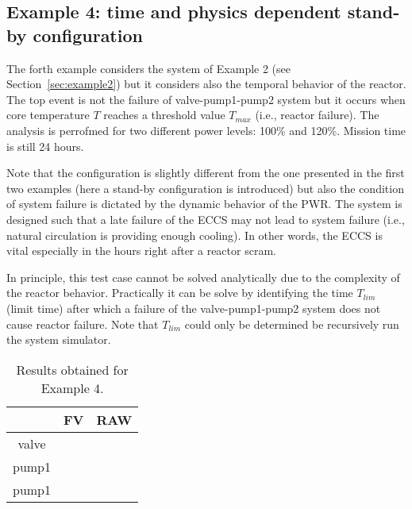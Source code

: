 \subsection{Example 4: time and physics dependent stand-by configuration}
\label{sec:example4}

The forth example considers the system of Example 2 (see Section~\ref{sec:example2}) but it considers 
also the temporal behavior of the reactor.
The top event is not the failure of valve-pump1-pump2 system but it occurs when core temperature $T$
reaches a threshold value $T_{max}$ (i.e., reactor failure). 
The analysis is perrofmed for two different power levels: 100\% and 120\%.
Mission time is still 24 hours.

Note that the configuration is slightly different from the one presented in the first two 
examples (here a stand-by configuration is introduced) but also the condition of system failure 
is dictated by the dynamic behavior of the PWR.  The system is designed such that a late failure 
of the ECCS may not lead to system failure (i.e., natural circulation is providing enough cooling). 
In other words, the ECCS is vital especially in the hours right after a reactor scram.

In principle, this test case cannot be solved analytically due to the complexity of the reactor behavior.
Practically it can be solve by identifying the time $T_{lim}$ (limit time) after which a failure of the  
valve-pump1-pump2 system does not cause reactor failure.
Note that $T_{lim}$ could only be determined be recursively run the system simulator. 

\begin{table}
  \caption{Results obtained for Example 4.}
  \centering
  \begin{tabular}{c | c | c }
    \hline
          & FV & RAW \\
    \hline
    valve &  &   \\
    pump1 &  &   \\
    pump1 &  &   \\
    \hline
  \end{tabular}
  \label{tab:example4}
\end{table}
